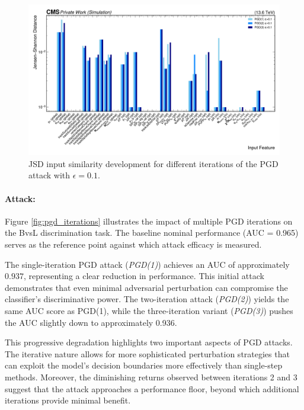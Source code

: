 \begin{figure}[h]
\centering
    \includegraphics[width=15cm]{media/output/features/compare/jsd_pgd_iterations_featurewise_hor.pdf}
    \caption{JSD input similarity development for different iterations of the PGD attack with $\epsilon=0.1$.}
    \label{fig:pgd_input_overview}
\end{figure}

\paragraph{Attack:} Figure \ref{fig:pgd_iterations} illustrates the impact of multiple PGD iterations on the BvsL discrimination task. The baseline nominal performance (AUC = 0.965) serves as the reference point against which attack efficacy is measured.

The single-iteration PGD attack (\emph{PGD(1)}) achieves an AUC of approximately $0.937$, representing a clear reduction in performance. This initial attack demonstrates that even minimal adversarial perturbation can compromise the classifier's discriminative power. The two-iteration attack (\emph{PGD(2)}) yields the same AUC score as PGD(1), while the three-iteration variant (\emph{PGD(3)}) pushes the AUC slightly down to approximately 0.936.

This progressive degradation highlights two important aspects of PGD attacks. The iterative nature allows for more sophisticated perturbation strategies that can exploit the model's decision boundaries more effectively than single-step methods. Moreover, the diminishing returns observed between iterations 2 and 3 suggest that the attack approaches a performance floor, beyond which additional iterations provide minimal benefit.

